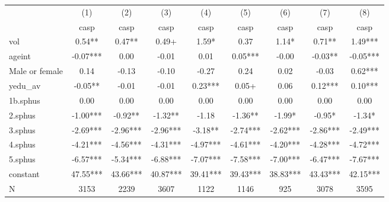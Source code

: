 {
\def\sym#1{\ifmmode^{#1}\else\(^{#1}\)\fi}
\begin{tabular}{l*{8}{c}}
\hline\hline
                    &\multicolumn{1}{c}{(1)}&\multicolumn{1}{c}{(2)}&\multicolumn{1}{c}{(3)}&\multicolumn{1}{c}{(4)}&\multicolumn{1}{c}{(5)}&\multicolumn{1}{c}{(6)}&\multicolumn{1}{c}{(7)}&\multicolumn{1}{c}{(8)}\\
                    &\multicolumn{1}{c}{casp}&\multicolumn{1}{c}{casp}&\multicolumn{1}{c}{casp}&\multicolumn{1}{c}{casp}&\multicolumn{1}{c}{casp}&\multicolumn{1}{c}{casp}&\multicolumn{1}{c}{casp}&\multicolumn{1}{c}{casp}\\
\hline
vol                 &        0.54** &        0.47** &        0.49+  &        1.59*  &        0.37   &        1.14*  &        0.71** &        1.49***\\
ageint              &       -0.07***&        0.00   &       -0.01   &        0.01   &        0.05***&       -0.00   &       -0.03** &       -0.05***\\
Male or female      &        0.14   &       -0.13   &       -0.10   &       -0.27   &        0.24   &        0.02   &       -0.03   &        0.62***\\
yedu\_av             &       -0.05** &       -0.01   &       -0.01   &        0.23***&        0.05+  &        0.06   &        0.12***&        0.10***\\
1b.sphus            &        0.00   &        0.00   &        0.00   &        0.00   &        0.00   &        0.00   &        0.00   &        0.00   \\
2.sphus             &       -1.00***&       -0.92** &       -1.32** &       -1.18   &       -1.36** &       -1.99*  &       -0.95*  &       -1.34*  \\
3.sphus             &       -2.69***&       -2.96***&       -2.96***&       -3.18** &       -2.74***&       -2.62***&       -2.86***&       -2.49***\\
4.sphus             &       -4.21***&       -4.56***&       -4.31***&       -4.97***&       -4.61***&       -4.20***&       -4.28***&       -4.72***\\
5.sphus             &       -6.57***&       -5.34***&       -6.88***&       -7.07***&       -7.58***&       -7.00***&       -6.47***&       -7.67***\\
constant            &       47.55***&       43.66***&       40.87***&       39.41***&       39.43***&       38.83***&       43.43***&       42.15***\\
\hline
N                   &        3153   &        2239   &        3607   &        1122   &        1146   &         925   &        3078   &        3595   \\
\hline\hline
\end{tabular}
}
